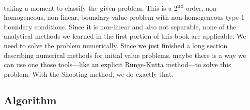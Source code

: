  taking a moment to classify the given problem.  This is a 2\textsuperscript{nd}-order, non-homogeneous, non-linear, boundary value problem with non-homogeneous type-1 boundary conditions.  Since it is non-linear and also not separable, none of the analytical methods we learned in the first portion of this book are applicable.  We need to solve the problem numerically.  Since we just finished a long section describing numerical methods for initial value problems, maybe there is a way we can use one those tools---like an explicit Runge-Kutta method---to solve this problem.  With the Shooting method, we do exactly that.

\subsection{Algorithm}
